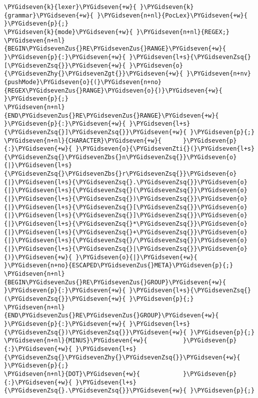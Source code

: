 \begin{Verbatim}[commandchars=\\\{\}]
\PYGidseven{k}{lexer}\PYGidseven{+w}{ }\PYGidseven{k}{grammar}\PYGidseven{+w}{ }\PYGidseven{n+nl}{PocLex}\PYGidseven{+w}{ }\PYGidseven{p}{;}
\PYGidseven{k}{mode}\PYGidseven{+w}{ }\PYGidseven{n+nl}{REGEX;}
\PYGidseven{n+nl}{BEGIN\PYGidsevenZus{}RE\PYGidsevenZus{}RANGE}\PYGidseven{+w}{ }\PYGidseven{p}{:}\PYGidseven{+w}{ }\PYGidseven{l+s}{\PYGidsevenZsq{}[\PYGidsevenZsq{}}\PYGidseven{+w}{ }\PYGidseven{o}{\PYGidsevenZhy{}\PYGidsevenZgt{}}\PYGidseven{+w}{ }\PYGidseven{n+nv}{pushMode}\PYGidseven{o}{(}\PYGidseven{n+no}{REGEX\PYGidsevenZus{}RANGE}\PYGidseven{o}{)}\PYGidseven{+w}{ }\PYGidseven{p}{;}
\PYGidseven{n+nl}{END\PYGidsevenZus{}RE\PYGidsevenZus{}RANGE}\PYGidseven{+w}{   }\PYGidseven{p}{:}\PYGidseven{+w}{ }\PYGidseven{l+s}{\PYGidsevenZsq{}]\PYGidsevenZsq{}}\PYGidseven{+w}{ }\PYGidseven{p}{;}
\PYGidseven{n+nl}{CHARACTER}\PYGidseven{+w}{      }\PYGidseven{p}{:}\PYGidseven{+w}{ }\PYGidseven{o}{\PYGidsevenZti{}(}\PYGidseven{l+s}{\PYGidsevenZsq{}\PYGidsevenZbs{}n\PYGidsevenZsq{}}\PYGidseven{o}{|}\PYGidseven{l+s}{\PYGidsevenZsq{}\PYGidsevenZbs{}r\PYGidsevenZsq{}}\PYGidseven{o}{|}\PYGidseven{l+s}{\PYGidsevenZsq{}.\PYGidsevenZsq{}}\PYGidseven{o}{|}\PYGidseven{l+s}{\PYGidsevenZsq{}(\PYGidsevenZsq{}}\PYGidseven{o}{|}\PYGidseven{l+s}{\PYGidsevenZsq{})\PYGidsevenZsq{}}\PYGidseven{o}{|}\PYGidseven{l+s}{\PYGidsevenZsq{}[\PYGidsevenZsq{}}\PYGidseven{o}{|}\PYGidseven{l+s}{\PYGidsevenZsq{}]\PYGidsevenZsq{}}\PYGidseven{o}{|}\PYGidseven{l+s}{\PYGidsevenZsq{}*\PYGidsevenZsq{}}\PYGidseven{o}{|}\PYGidseven{l+s}{\PYGidsevenZsq{}+\PYGidsevenZsq{}}\PYGidseven{o}{|}\PYGidseven{l+s}{\PYGidsevenZsq{}/\PYGidsevenZsq{}}\PYGidseven{o}{|}\PYGidseven{l+s}{\PYGidsevenZsq{}|\PYGidsevenZsq{}}\PYGidseven{o}{)}\PYGidseven{+w}{ }\PYGidseven{o}{|}\PYGidseven{+w}{ }\PYGidseven{n+no}{ESCAPED\PYGidsevenZus{}META}\PYGidseven{p}{;}
\PYGidseven{n+nl}{BEGIN\PYGidsevenZus{}RE\PYGidsevenZus{}GROUP}\PYGidseven{+w}{ }\PYGidseven{p}{:}\PYGidseven{+w}{ }\PYGidseven{l+s}{\PYGidsevenZsq{}(\PYGidsevenZsq{}}\PYGidseven{+w}{ }\PYGidseven{p}{;}
\PYGidseven{n+nl}{END\PYGidsevenZus{}RE\PYGidsevenZus{}GROUP}\PYGidseven{+w}{   }\PYGidseven{p}{:}\PYGidseven{+w}{ }\PYGidseven{l+s}{\PYGidsevenZsq{})\PYGidsevenZsq{}}\PYGidseven{+w}{ }\PYGidseven{p}{;}
\PYGidseven{n+nl}{MINUS}\PYGidseven{+w}{          }\PYGidseven{p}{:}\PYGidseven{+w}{ }\PYGidseven{l+s}{\PYGidsevenZsq{}\PYGidsevenZhy{}\PYGidsevenZsq{}}\PYGidseven{+w}{ }\PYGidseven{p}{;}
\PYGidseven{n+nl}{DOT}\PYGidseven{+w}{            }\PYGidseven{p}{:}\PYGidseven{+w}{ }\PYGidseven{l+s}{\PYGidsevenZsq{}.\PYGidsevenZsq{}}\PYGidseven{+w}{ }\PYGidseven{p}{;}

\end{Verbatim}

